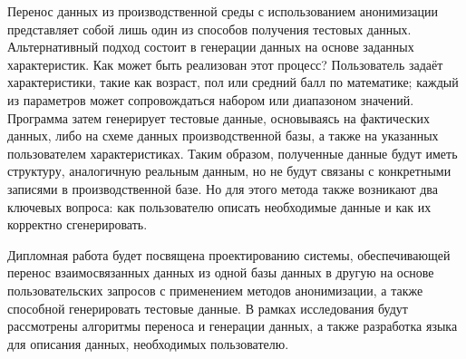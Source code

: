 Перенос данных из производственной среды с использованием анонимизации представляет собой лишь один из способов получения тестовых данных. Альтернативный подход состоит в генерации данных на основе заданных характеристик. Как может быть реализован этот процесс? Пользователь задаёт характеристики, такие как возраст, пол или средний балл по математике; каждый из параметров может сопровождаться набором или диапазоном значений. Программа затем генерирует тестовые данные, основываясь на фактических данных, либо на схеме данных производственной базы, а также на указанных пользователем характеристиках. Таким образом, полученные данные будут иметь структуру, аналогичную реальным данным, но не будут связаны с конкретными записями в производственной базе. Но для этого метода также возникают два ключевых вопроса: как пользователю описать необходимые данные и как их корректно сгенерировать.

Дипломная работа будет посвящена проектированию системы, обеспечивающей перенос взаимосвязанных данных из одной базы данных в другую на основе пользовательских запросов с применением методов анонимизации, а также способной генерировать тестовые данные. В рамках исследования будут рассмотрены алгоритмы переноса и генерации данных, а также разработка языка для описания данных, необходимых пользователю.

